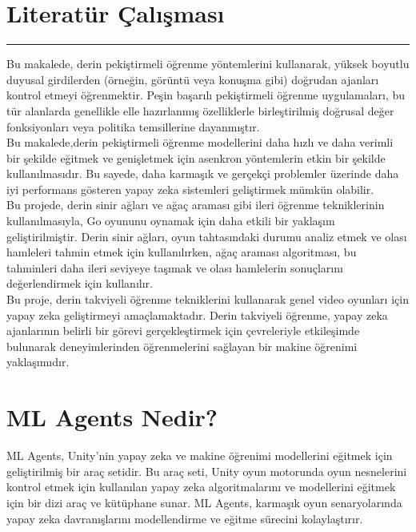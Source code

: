 \documentclass{article}
\begin{document}
  \section{Literatür Çalışması}
\rule{\textwidth}{0.5pt}
Bu makalede, derin pekiştirmeli öğrenme yöntemlerini kullanarak, yüksek boyutlu duyusal girdilerden (örneğin, görüntü veya konuşma gibi) doğrudan ajanları kontrol etmeyi öğrenmektir. Peşin başarılı pekiştirmeli öğrenme uygulamaları, bu tür alanlarda genellikle elle hazırlanmış özelliklerle birleştirilmiş doğrusal değer fonksiyonları veya politika temsillerine dayanmıştır\cite{mnih2013playing}.\\[15pt]

Bu makalede,derin pekiştirmeli öğrenme modellerini daha hızlı ve daha verimli bir şekilde eğitmek ve genişletmek için asenkron yöntemlerin etkin bir şekilde kullanılmasıdır. Bu sayede, daha karmaşık ve gerçekçi problemler üzerinde daha iyi performans gösteren yapay zeka sistemleri geliştirmek mümkün olabilir\cite{mnih2016asynchronous}.\\[15pt]

Bu projede, derin sinir ağları ve ağaç araması gibi ileri öğrenme tekniklerinin kullanılmasıyla, Go oyununu oynamak için daha etkili bir yaklaşım geliştirilmiştir. Derin sinir ağları, oyun tahtasındaki durumu analiz etmek ve olası hamleleri tahmin etmek için kullanılırken, ağaç araması algoritması, bu tahminleri daha ileri seviyeye taşımak ve olası hamlelerin sonuçlarını değerlendirmek için kullanılır\cite{silver2016mastering}.\\[15pt]

Bu proje, derin takviyeli öğrenme tekniklerini kullanarak genel video oyunları için yapay zeka geliştirmeyi amaçlamaktadır. Derin takviyeli öğrenme, yapay zeka ajanlarının belirli bir görevi gerçekleştirmek için çevreleriyle etkileşimde bulunarak deneyimlerinden öğrenmelerini sağlayan bir makine öğrenimi yaklaşımıdır.\cite{torrado2018deep}


\newpage


\clearpage


\section{ML Agents Nedir?}
ML Agents, Unity'nin yapay zeka ve makine öğrenimi modellerini eğitmek için geliştirilmiş bir araç setidir. Bu araç seti, Unity oyun motorunda oyun nesnelerini kontrol etmek için kullanılan yapay zeka algoritmalarını ve modellerini eğitmek için bir dizi araç ve kütüphane sunar. ML Agents, karmaşık oyun senaryolarında yapay zeka davranışlarını modellendirme ve eğitme sürecini kolaylaştırır.
\end{document}
